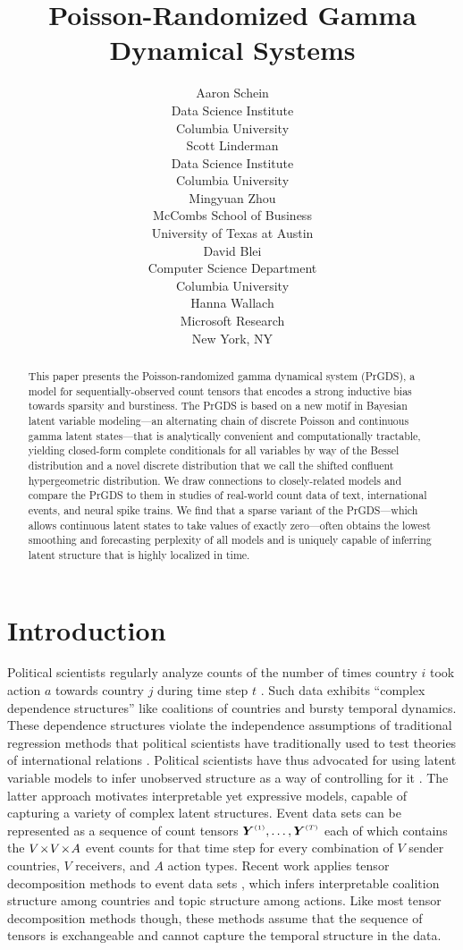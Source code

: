 \documentclass{article}
\title{Poisson-Randomized Gamma Dynamical Systems}
\author{%
  Aaron Schein \\
  Data Science Institute\\
  Columbia University\\
  \And
  Scott Linderman \\
  Data Science Institute\\
  Columbia University\\
  \AND
  Mingyuan Zhou \\
  McCombs School of Business\\
  University of Texas at Austin\\
  \And
  David Blei \\
  Computer Science Department\\
  Columbia University\\
  \And
  Hanna Wallach \\
  Microsoft Research\\
  New York, NY\\
}
\begin{document}
\maketitle

\begin{abstract}
This paper presents the Poisson-randomized gamma dynamical system (PrGDS), a model for sequentially-observed count tensors that encodes a strong inductive bias towards sparsity and burstiness. The PrGDS is based on a new motif in Bayesian latent variable modeling---an alternating chain of discrete Poisson and continuous gamma latent states---that is analytically convenient and computationally tractable, yielding closed-form complete conditionals for all variables by way of the Bessel distribution and a novel discrete distribution that we call the shifted confluent hypergeometric distribution. We draw connections to closely-related models and compare the PrGDS to them in studies of real-world count data of text, international events, and neural spike trains. We find that a sparse variant of the PrGDS---which allows continuous latent states to take values of exactly zero---often obtains the lowest smoothing and forecasting perplexity of all models and is uniquely capable of inferring latent structure that is highly localized in time.~
\end{abstract}

\section{Introduction}

Political scientists regularly analyze counts of the number of times country $i$ took action $a$ towards country $j$ during time step $t$ \cite{schrodt1995event}. Such data exhibits ``complex dependence structures'' \cite{king2001proper} like coalitions of countries and bursty temporal dynamics. These dependence structures violate the independence assumptions of traditional regression methods that political scientists have traditionally used to test theories of international relations \cite{green2001dirty,poast2010mis,erikson2014dyadic}. Political scientists have thus advocated for using latent variable models to infer unobserved structure as a way of controlling for it \cite{stewart2014latent}. The latter approach motivates interpretable yet expressive models, capable of capturing a variety of complex latent structures. Event data sets can be represented as a sequence of count tensors $\Yten^{\mathsmaller{(1)}},\dots,\Yten^{\mathsmaller{(T)}}$ each of which contains the $V \!\times\! V \!\times\! A$ event counts for that time step for every combination of $V$ sender countries, $V$ receivers, and $A$ action types. Recent work applies tensor decomposition methods to event data sets \cite{hoff2004modeling,hoff2015multilinear,schein2015bayesian,hoff2016equivariant,schein2016bayesian}, which infers interpretable coalition structure among countries and topic structure among actions. Like most tensor decomposition methods though, these methods assume that the sequence of tensors is exchangeable and cannot capture the temporal structure in the data.~  
\end{document}
